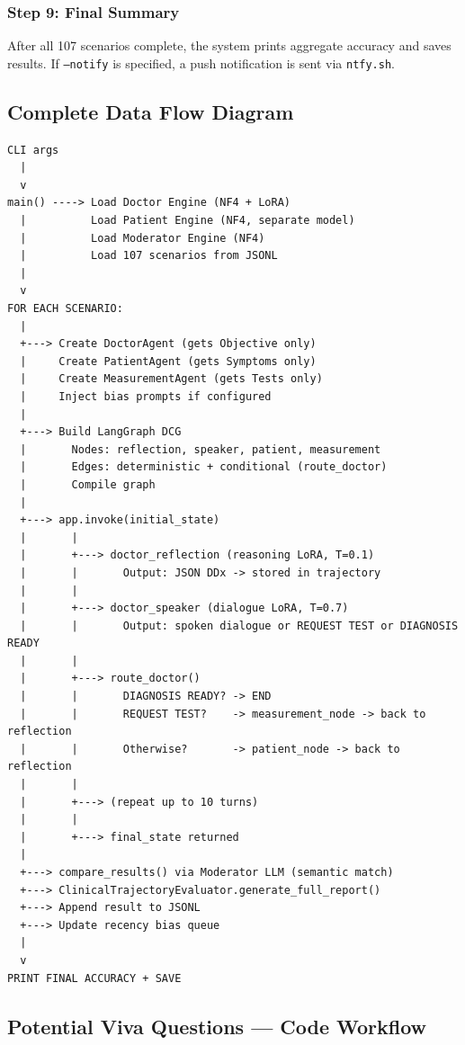 \subsubsection{Step 9: Final Summary}

After all 107 scenarios complete, the system prints aggregate accuracy and saves results. If \texttt{--notify} is specified, a push notification is sent via \texttt{ntfy.sh}.

\subsection{Complete Data Flow Diagram}

\begin{verbatim}
CLI args
  |
  v
main() ----> Load Doctor Engine (NF4 + LoRA)
  |          Load Patient Engine (NF4, separate model)
  |          Load Moderator Engine (NF4)
  |          Load 107 scenarios from JSONL
  |
  v
FOR EACH SCENARIO:
  |
  +---> Create DoctorAgent (gets Objective only)
  |     Create PatientAgent (gets Symptoms only)
  |     Create MeasurementAgent (gets Tests only)
  |     Inject bias prompts if configured
  |
  +---> Build LangGraph DCG
  |       Nodes: reflection, speaker, patient, measurement
  |       Edges: deterministic + conditional (route_doctor)
  |       Compile graph
  |
  +---> app.invoke(initial_state)
  |       |
  |       +---> doctor_reflection (reasoning LoRA, T=0.1)
  |       |       Output: JSON DDx -> stored in trajectory
  |       |
  |       +---> doctor_speaker (dialogue LoRA, T=0.7)
  |       |       Output: spoken dialogue or REQUEST TEST or DIAGNOSIS READY
  |       |
  |       +---> route_doctor()
  |       |       DIAGNOSIS READY? -> END
  |       |       REQUEST TEST?    -> measurement_node -> back to reflection
  |       |       Otherwise?       -> patient_node -> back to reflection
  |       |
  |       +---> (repeat up to 10 turns)
  |       |
  |       +---> final_state returned
  |
  +---> compare_results() via Moderator LLM (semantic match)
  +---> ClinicalTrajectoryEvaluator.generate_full_report()
  +---> Append result to JSONL
  +---> Update recency bias queue
  |
  v
PRINT FINAL ACCURACY + SAVE
\end{verbatim}

\subsection{Potential Viva Questions --- Code Workflow}

